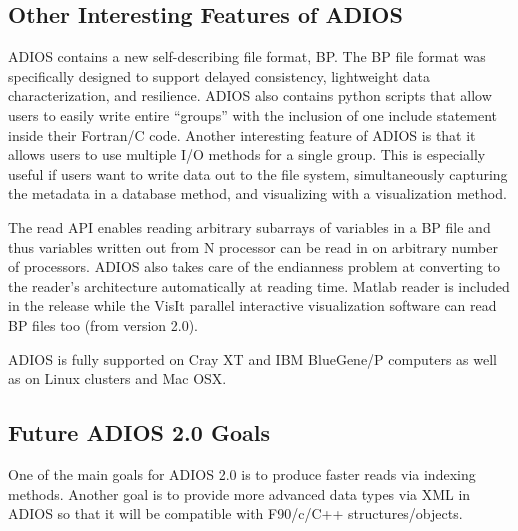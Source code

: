 \subsection{Other Interesting Features of ADIOS}

\parindent=0pt
ADIOS contains a new self-describing file format, BP. The BP file format was specifically 
designed to support delayed consistency, lightweight data characterization, and 
resilience. ADIOS also contains python scripts that allow users to easily write 
entire ``groups'' with the inclusion of one include statement inside their Fortran/C 
code. Another interesting feature of ADIOS is that it allows users to use multiple 
I/O methods for a single group. This is especially useful if users want to write 
data out to the file system, simultaneously capturing the metadata in a database 
method, and visualizing with a visualization method.

The read API enables reading arbitrary subarrays of variables in a BP file and 
thus variables written out from N processor can be read in on arbitrary number 
of processors. ADIOS also takes care of the endianness problem at converting to 
the reader's architecture automatically at reading time. Matlab reader is included 
in the release while the VisIt parallel interactive visualization software can 
read BP files too (from version 2.0). 

ADIOS is fully supported on Cray XT and IBM BlueGene/P computers as well as on 
Linux clusters and Mac OSX. \label{HToc84890219}\label{HToc212016594}\label{HToc212016836}\label{HToc182553327}

\subsection{Future ADIOS 2.0 Goals}

One of the main goals for ADIOS 2.0 is to produce faster reads via indexing methods. 
Another goal is to provide more advanced data types via XML in ADIOS so that it 
will be compatible with F90/c/C++ structures/objects. 

